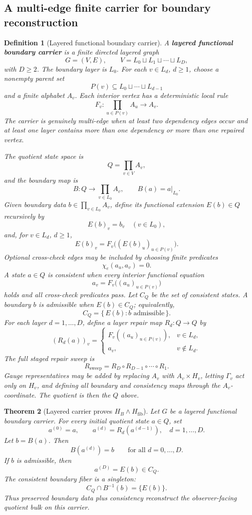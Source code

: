 \documentclass[11pt]{article}
\newtheorem{theorem}{Theorem}[section]
\newtheorem{definition}[theorem]{Definition}
\theoremstyle{remark}
\theoremstyle{plain}
\begin{document}
\subsection{A multi-edge finite carrier for boundary reconstruction}

\begin{definition}[Layered functional boundary carrier]\label{def:layered-functional-boundary-carrier}
A \textbf{layered functional boundary carrier} is a finite directed layered graph
\[
G=(V,E),\qquad V=L_0\sqcup L_1\sqcup\cdots\sqcup L_D,
\]
with \(D\ge2\).  The boundary layer is \(L_0\).  For each \(v\in L_d\), \(d\ge1\), choose a
nonempty parent set
\[
P(v)\subseteq L_0\sqcup\cdots\sqcup L_{d-1}
\]
and a finite alphabet \(A_v\).  Each interior vertex has a deterministic local rule
\[
F_v:\prod_{u\in P(v)}A_u\to A_v.
\]
The carrier is genuinely multi-edge when at least two dependency edges occur and at least one layer
contains more than one dependency or more than one repaired vertex.

The quotient state space is
\[
Q=\prod_{v\in V}A_v,
\]
and the boundary map is
\[
B:Q\to\prod_{v\in L_0}A_v,\qquad B(a)=a|_{L_0}.
\]
Given boundary data \(b\in\prod_{v\in L_0}A_v\), define its functional extension \(E(b)\in Q\)
recursively by
\[
E(b)_v=b_v\quad(v\in L_0),
\]
and, for \(v\in L_d\), \(d\ge1\),
\[
E(b)_v=F_v\bigl((E(b)_u)_{u\in P(v)}\bigr).
\]
Optional cross-check edges may be included by choosing finite predicates
\[
\chi_e(a_u,a_v)=0.
\]
A state \(a\in Q\) is consistent when every interior functional equation
\[
a_v=F_v\bigl((a_u)_{u\in P(v)}\bigr)
\]
holds and all cross-check predicates pass.  Let \(C_Q\) be the set of consistent states.  A
boundary \(b\) is admissible when \(E(b)\in C_Q\); equivalently,
\[
C_Q=\{\,E(b):b\text{ admissible}\,\}.
\]
For each layer \(d=1,\ldots,D\), define a layer repair map \(R_d:Q\to Q\) by
\[
(R_d(a))_v=
\begin{cases}
F_v((a_u)_{u\in P(v)}),& v\in L_d,\\
a_v,& v\notin L_d.
\end{cases}
\]
The full staged repair sweep is
\[
R_{\mathrm{sweep}}=R_D\circ R_{D-1}\circ\cdots\circ R_1.
\]
Gauge representatives may be added by replacing \(A_v\) with \(A_v\times H_v\), letting
\(\Gamma_v\) act only on \(H_v\), and defining all boundary and consistency maps through the
\(A_v\)-coordinate.  The quotient is then the \(Q\) above.
\end{definition}

\begin{theorem}[Layered carrier proves \(H_B\wedge H_{\mathrm{fib}}\)]\label{thm:layered-carrier-HB-Hfib}
Let \(G\) be a layered functional boundary carrier.  For every initial quotient state \(a\in Q\),
set
\[
a^{(0)}=a,\qquad a^{(d)}=R_d(a^{(d-1)}),\quad d=1,\ldots,D.
\]
Let \(b=B(a)\).  Then
\[
B(a^{(d)})=b
\qquad
\text{for all }d=0,\ldots,D.
\]
If \(b\) is admissible, then
\[
a^{(D)}=E(b)\in C_Q.
\]
The consistent boundary fiber is a singleton:
\[
C_Q\cap B^{-1}(b)=\{E(b)\}.
\]
Thus preserved boundary data plus consistency reconstruct the observer-facing quotient bulk on this
carrier.
\end{theorem}
\end{document}
